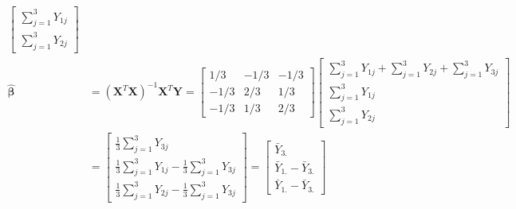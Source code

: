 \documentclass{article}
\begin{document}
\begin{enumerate}[leftmargin = 0 em, label = \arabic*., font = \bfseries]
\begin{enumerate}
\begin{align*}
\begin{bmatrix}
			\sum_{j = 1}^3 Y_{1j}\\
			\sum_{j = 1}^3 Y_{2j}
		\end{bmatrix}
		\\
		\hat{\bm \beta} &= (\bm X^T \bm X)^{-1}\bm X^T \bm Y = 
		\begin{bmatrix}
			1/3 & -1/3 & -1/3\\
			-1/3 & 2/3 & 1/3\\
			-1/3 & 1/3 & 2/3
		\end{bmatrix}
		\begin{bmatrix}
			\sum_{j = 1}^3 Y_{1j} + \sum_{j = 1}^3 Y_{2j} + \sum_{j = 1}^3 Y_{3j}\\
			\sum_{j = 1}^3 Y_{1j}\\
			\sum_{j = 1}^3 Y_{2j}
		\end{bmatrix}
		\\
		& = \begin{bmatrix}
			\frac{1}{3} \sum_{j = 1}^3 Y_{3j}\\
			\frac{1}{3} \sum_{j = 1}^3 Y_{1j} - \frac{1}{3} \sum_{j = 1}^3 Y_{3j}\\
			\frac{1}{3} \sum_{j = 1}^3 Y_{2j} - \frac{1}{3} \sum_{j = 1}^3 Y_{3j}
		\end{bmatrix}
		=
		\begin{bmatrix}
			\bar{Y}_{3.}\\
			\bar{Y}_{1.} - \bar{Y}_{3.}\\
			\bar{Y}_{1.} - \bar{Y}_{3.}
		\end{bmatrix}
		\end{align*}



\end{enumerate}
\end{enumerate}
\end{document}
